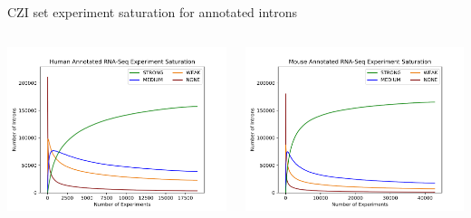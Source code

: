 \documentclass[10pt,
               hyperref={bookmarks=false,
                         bookmarksopen=false,
                         colorlinks=true,
                         linkcolor=blue,
                         urlcolor=blue},
               xcolor={svgnames,table}]{beamer}
\begin{document}
\begin{frame}{CZI set experiment saturation for annotated introns}
  \begin{columns}
    \begin{column}{0.5\textwidth}
      \includegraphics[scale=0.37]{images/hs_saturation_annot.pdf}
    \end{column}
    \begin{column}{0.5\textwidth}
      \includegraphics[scale=0.37]{images/mm_saturation_annot.pdf}
    \end{column}
  \end{columns}
\end{frame}
\end{document}
